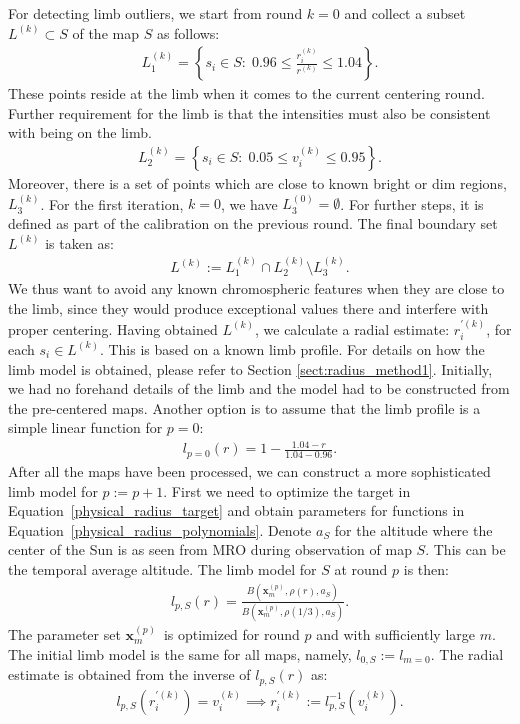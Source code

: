 \documentclass{aa}
\newcommand{\eqnl}[2]{\begin{eqnarray}\label{#1}#2\end{eqnarray}}
\begin{document}
  For detecting limb outliers, we start from round $k=0$ and collect a subset $L^{(k)} \subset S$ of the map $S$ as follows:
  \eqnl{calib_subset1}{
  L^{(k)}_1 = \left\{ s_i \in S:\; 0.96 \le \frac{r_i^{(k)}}{r^{(k)}} \le 1.04 \right\} \text{.}
  }
  These points reside at the limb when it comes to the current centering round. Further requirement for the limb is that the intensities must also be consistent with being on the limb.
  \eqnl{calib_subset2}{
  L^{(k)}_2 = \left\{ s_i \in S:\; 0.05 \le v_i^{(k)} \le 0.95 \right\} \text{.}
  }
  Moreover, there is a set of points which are close to known bright or dim regions, $L^{(k)}_3$. For the first 
  iteration, $k=0$, we have $L^{(0)}_3 = \emptyset$. For further steps, it is defined as part of the calibration on the 
  previous round. The final boundary set $L^{(k)}$ is taken as:
  \eqnl{calib_subset3}{
  L^{(k)} := L^{(k)}_1 \cap L^{(k)}_2 \setminus L^{(k)}_3 \text{.}
  }
  We thus want to avoid any known chromospheric features when they are close to the limb, since they would produce 
  exceptional values there and interfere with proper centering. Having obtained $L^{(k)}$, we calculate a radial 
  estimate: $r_i^{\prime(k)}$, for each $s_i \in L^{(k)}$. This is based on a known limb profile. For details on how the limb model is obtained, please refer to Section \ref{sect:radius_method1}. Initially, we had no forehand details of the limb and the model had to be constructed from the pre-centered maps. Another option is to assume that the limb profile is a simple linear function for $p=0$:
  \eqnl{calib_limbmodel1}{
  l_{p=0}(r) = 1 - \frac{1.04 - r}{1.04 - 0.96} \text{.}
  }
  After all the maps have been processed, we can construct a more sophisticated limb model for $p := p+1$. First we need to optimize the target in Equation~\ref{physical_radius_target} and obtain parameters for functions in Equation~\ref{physical_radius_polynomials}. Denote $a_S$ for the altitude where the center of the Sun is as seen from MRO during observation of map $S$. This can be the temporal average altitude. The limb model for $S$ at round $p$ is then:
  \eqnl{calib_limbmodel2}{
  l_{p,S}(r) = \frac{B(\bm{x}_m^{(p)}, \rho(r), a_S)}{B(\bm{x}_m^{(p)}, \rho(1/3), a_S)} \text{.}
  }
  The parameter set $\bm{x}_m^{(p)}$ is optimized for round $p$ and with sufficiently large $m$. The initial limb model is the same for all maps, namely, $l_{0,S} := l_{m=0}$. 
The radial estimate is obtained from the inverse of $l_{p,S}(r)$ as:
  \eqnl{calib_limbmodel3}{
  l_{p,S}(r_i^{\prime(k)}) = v_i^{(k)} \implies r_i^{\prime(k)} := l_{p,S}^{-1}(v_i^{(k)}) \text{.}
  }
\end{document}
